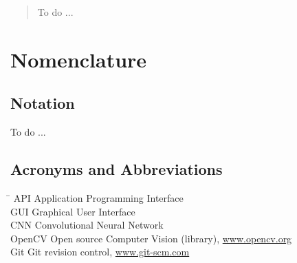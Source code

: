 \begin{abstract}
To do ... 
\end{abstract}

\chapter*{Nomenclature}\label{ch:symbols}

\section*{Notation}
\label{sec:notation}

To do ...

\section*{Acronyms and Abbreviations}
\label{sec:acronyms}

\begin{tabbing}
	\hspace*{3.5cm}		\= \kill
	API \> Application Programming Interface \\[1ex]
	GUI \> Graphical User Interface \\[1ex]
	CNN \> Convolutional Neural Network\\[1ex]
	OpenCV  \> Open source Computer Vision (library), \url{www.opencv.org} \\[1ex]
	Git  \> Git revision control, \url{www.git-scm.com} \\[1ex]
\end{tabbing}
